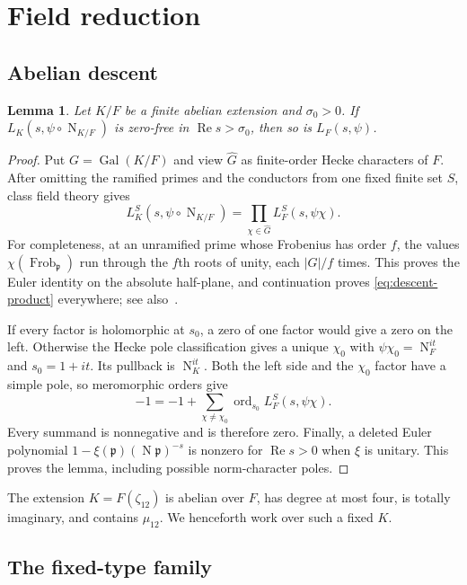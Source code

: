 \documentclass[11pt,a4paper]{article}
\numberwithin{equation}{section}
\newtheorem{lemma}[theorem]{Lemma}
\theoremstyle{definition}
\theoremstyle{remark}
\newcommand{\Rea}{\operatorname{Re}}
\newcommand{\Norm}{\operatorname{N}}
\begin{document}
\section{Field reduction}\label{sec:field}

\subsection{Abelian descent}

\begin{lemma}\label{lem:descent}
Let $K/F$ be a finite abelian extension and $\sigma_0>0$.  If
$L_K(s,\psi\circ\Norm_{K/F})$ is zero-free in $\Rea s>\sigma_0$, then
so is $L_F(s,\psi)$.
\end{lemma}
\begin{proof}
Put $G=\operatorname{Gal}(K/F)$ and view $\widehat G$ as finite-order
Hecke characters of $F$.  After omitting the ramified primes and the
conductors from one fixed finite set $S$, class field theory gives
\begin{equation}\label{eq:descent-product}
 L_K^S(s,\psi\circ\Norm_{K/F})
   =\prod_{\chi\in\widehat G}L_F^S(s,\psi\chi).
\end{equation}
For completeness, at an unramified prime whose Frobenius has order $f$,
the values $\chi(\operatorname{Frob}_{\mathfrak p})$ run through the
$f$th roots of unity, each $|G|/f$ times.  This proves the Euler identity
on the absolute half-plane, and continuation proves
\eqref{eq:descent-product} everywhere; see also\ \cite{Milne}.

If every factor is holomorphic at $s_0$, a zero of one factor would give a
zero on the left.  Otherwise the Hecke pole classification gives a unique
$\chi_0$ with $\psi\chi_0=\Norm_F^{it}$ and $s_0=1+it$.  Its pullback
is $\Norm_K^{it}$.  Both the left side and the $\chi_0$ factor have a
simple pole, so meromorphic orders give
\[
 -1=-1+\sum_{\chi\ne\chi_0}
          \operatorname{ord}_{s_0}L_F^S(s,\psi\chi).
\]
Every summand is nonnegative and is therefore zero.  Finally, a deleted
Euler polynomial $1-\xi(\mathfrak p)(\Norm\mathfrak p)^{-s}$ is nonzero
for $\Rea s>0$ when $\xi$ is unitary.  This proves the lemma, including
possible norm-character poles.
\end{proof}

The extension $K=F(\zeta_{12})$ is abelian over $F$, has degree at most
four, is totally imaginary, and contains $\mu_{12}$.    We henceforth work over such a fixed $K$.

\subsection{The fixed-type family}
\end{document}
